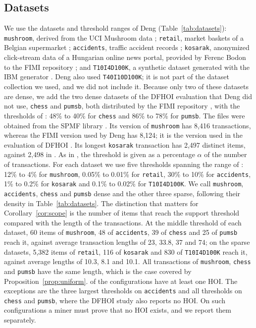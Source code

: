 \documentclass[pdflatex,sn-mathphys,Numbered]{sn-jnl}
\theoremstyle{thmstyleone}
\theoremstyle{thmstyletwo}
\theoremstyle{thmstylethree}
\begin{document}
\subsection{Datasets}\label{sec:exp-data}

We use the datasets and threshold ranges of Deng \cite[Section~4]{deng2020hoi} (Table~\ref{tab:datasets}): \texttt{mushroom}, derived from the UCI Mushroom data \cite{uci1981mushroom}; \texttt{retail}, market baskets of a Belgian supermarket \cite{brijs1999retail}; \texttt{accidents}, traffic accident records \cite{geurts2003accidents}; \texttt{kosarak}, anonymized click-stream data of a Hungarian online news portal, provided by Ferenc Bodon to the FIMI repository \cite{fimi2004repository}; and \texttt{T10I4D100K}, a synthetic dataset generated with the IBM generator \cite{agrawal1994fast}. Deng also used \texttt{T40I10D100K}; it is not part of the dataset collection we used, and we did not include it. Because only two of these datasets are dense, we add the two dense datasets of the DFHOI evaluation that Deng did not use, \texttt{chess} and \texttt{pumsb}, both distributed by the FIMI repository \cite{fimi2004repository}, with the thresholds of \cite[Table~8]{nguyen2023dfhoi}: 48\% to 40\% for \texttt{chess} and 86\% to 78\% for \texttt{pumsb}. The files were obtained from the SPMF library \cite{spmfdatasets,fournier2016spmf}. Its version of \texttt{mushroom} has 8,416 transactions, whereas the FIMI version used by Deng has 8,124; it is the version used in the evaluation of DFHOI \cite[Table~8]{nguyen2023dfhoi}. Its longest \texttt{kosarak} transaction has 2,497 distinct items, against 2,498 in \cite[Table~2]{deng2020hoi}. As in \cite{deng2020hoi}, the threshold is given as a percentage $\alpha$ of the number of transactions. For each dataset we use five thresholds spanning the range of \cite[Table~3]{deng2020hoi}: 12\% to 4\% for \texttt{mushroom}, 0.05\% to 0.01\% for \texttt{retail}, 30\% to 10\% for \texttt{accidents}, 1\% to 0.2\% for \texttt{kosarak} and 0.1\% to 0.02\% for \texttt{T10I4D100K}. We call \texttt{mushroom}, \texttt{accidents}, \texttt{chess} and \texttt{pumsb} dense and the other three sparse, following their density in Table~\ref{tab:datasets}. The distinction that matters for Corollary~\ref{cor:scope} is the number of items that reach the support threshold compared with the length of the transactions. At the middle threshold of each dataset, 60 items of \texttt{mushroom}, 48 of \texttt{accidents}, 39 of \texttt{chess} and 25 of \texttt{pumsb} reach it, against average transaction lengths of 23, 33.8, 37 and 74; on the sparse datasets, 5,382 items of \texttt{retail}, 116 of \texttt{kosarak} and 830 of \texttt{T10I4D100K} reach it, against average lengths of 10.3, 8.1 and 10.1. All transactions of \texttt{mushroom}, \texttt{chess} and \texttt{pumsb} have the same length, which is the case covered by Proposition~\ref{prop:uniform}. \NonEmptyConfigs{} of the \NumConfigs{} configurations have at least one HOI. The \ZeroHoiConfigs{} exceptions are the three largest thresholds on \texttt{accidents} and all thresholds on \texttt{chess} and \texttt{pumsb}, where the DFHOI study also reports no HOI. On such configurations a miner must prove that no HOI exists, and we report them separately.
\end{document}
